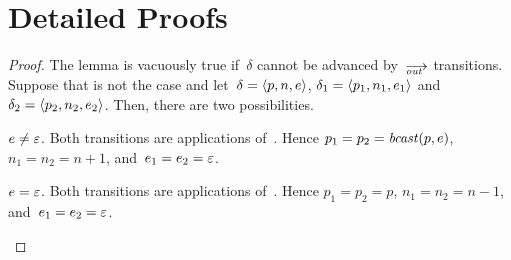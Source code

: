 \section{Detailed Proofs}
\label{sec.proofs}


\lemxdetout*
\begin{proof}
  The lemma is vacuously true if~$\delta$ cannot be advanced by~$\out$
  transitions.  Suppose that is not the case and let~$\delta=\<p,n,e>$,
  $\delta_1=\<p_1,n_1,e_1>$ and~$\delta_2=\<p_2,n_2,e_2>$.  Then, there are
  two possibilities.
  \begin{case}
  \item $e\ne\varepsilon$.  Both transitions are applications of~.
    Hence $p_1=p_2=\operatorname{\mathit{bcast}}(p,e)$, $n_1=n_2=n+1$, and~$e_1=e_2=\varepsilon$.
  \item $e=\varepsilon$.  Both transitions are applications of~.
    Hence $p_1=p_2=p$, $n_1=n_2=n-1$, and~$e_1=e_2=\varepsilon$.\qedhere
  \end{case}
\end{proof}

